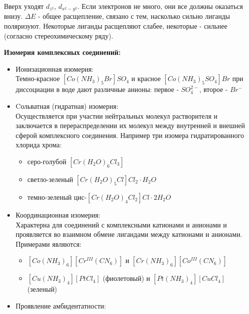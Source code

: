 Вверх уходят $d_{z^2}$, $d_{x^2 -y^2}$. Если электронов не много, они все должны оказаться внизу. $\Delta E$ - общее расщепление, связано с тем, насколько сильно лиганды поляризуют. Некоторые лиганды расщепляют слабее, некоторые - сильнее (согласно стереохимическому ряду).
\begin{flushleft}
	\begin{figure} [H]
	\centering {\texttt{[image: qq5]}}
\end{figure}
\end{flushleft}
\textbf{Изомерия комплексных соединений:} \\
\begin{itemize}
	\item Ионизационная изомерия: \\
	Темно-красное $\left[Co(NH_3)_5 Br \right]SO_4$ и красное $\left[Co(NH_3)_5SO_4 \right]Br$ при диссоциации в воде дают различные анионы: первое - $SO^{2-}_4$, второе - $Br^-$
	\item Cольватная (гидратная) изомерия: \\ 
	Осуществляется при участии нейтральных молекул растворителя и заключается в перераспределении их молекул между внутренней и внешней сферой комплексного соединения. Например три изомера гидратированного хлорида хрома:
	\begin{itemize}
		\item серо-голубой $\left[ Cr(H_2O)_6Cl_3  \right] $ 
		\item светло-зеленый $\left[ Cr(H_2O)_5Cl  \right]Cl_2 \cdot H_2O$ 
		\item темно-зеленый цис-$\left[ Cr(H_2O)_4Cl_2  \right]Cl \cdot 2H_2O$ 
	\end{itemize}
	\item Координационная изомерия: \\
	 Характерна для соединений с комплексными катионами и анионами и проявляется во взаимном обмене лигандами между катионами и анионами. \\
	 Примерами являются:
	 \begin{itemize}
	 	\item $\left[ Co(NH_3)_6  \right] \left[ Cr^{III}(CN_6)\right]$ и $\left[ Cr(NH_3)_6  \right] \left[ Co^{III}(CN_6)\right]$
	 	\item $\left[ Cu(NH_3)_4  \right] \left[ PtCl_4\right]$ (фиолетовый) и $\left[ Pt(NH_3)_4  \right] \left[ CuCl_4\right]$ (зеленый)
	 \end{itemize}
	\item Проявление амбидентатности: \\

\end{itemize}
